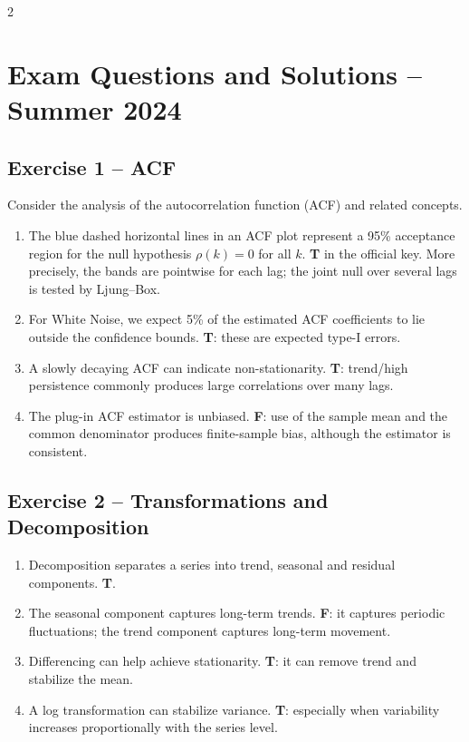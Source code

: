 \documentclass[9pt,a4paper]{extarticle}
\begin{document}
\begin{multicols}{2}
\raggedcolumns

\section{Exam Questions and Solutions -- Summer 2024}

\subsection*{Exercise 1 -- ACF}
Consider the analysis of the autocorrelation function (ACF) and related concepts.
\begin{enumerate}[label=\alph*),leftmargin=4mm]
\item The blue dashed horizontal lines in an ACF plot represent a 95\% acceptance region for the null hypothesis \(\rho(k)=0\) for all \(k\). \textbf{T} in the official key. More precisely, the bands are pointwise for each lag; the joint null over several lags is tested by Ljung--Box.
\item For White Noise, we expect 5\% of the estimated ACF coefficients to lie outside the confidence bounds. \textbf{T}: these are expected type-I errors.
\item A slowly decaying ACF can indicate non-stationarity. \textbf{T}: trend/high persistence commonly produces large correlations over many lags.
\item The plug-in ACF estimator is unbiased. \textbf{F}: use of the sample mean and the common denominator produces finite-sample bias, although the estimator is consistent.
\end{enumerate}

\subsection*{Exercise 2 -- Transformations and Decomposition}
\begin{enumerate}[label=\alph*),leftmargin=4mm]
\item Decomposition separates a series into trend, seasonal and residual components. \textbf{T}.
\item The seasonal component captures long-term trends. \textbf{F}: it captures periodic fluctuations; the trend component captures long-term movement.
\item Differencing can help achieve stationarity. \textbf{T}: it can remove trend and stabilize the mean.
\item A log transformation can stabilize variance. \textbf{T}: especially when variability increases proportionally with the series level.
\end{enumerate}


\end{multicols}
\end{document}
